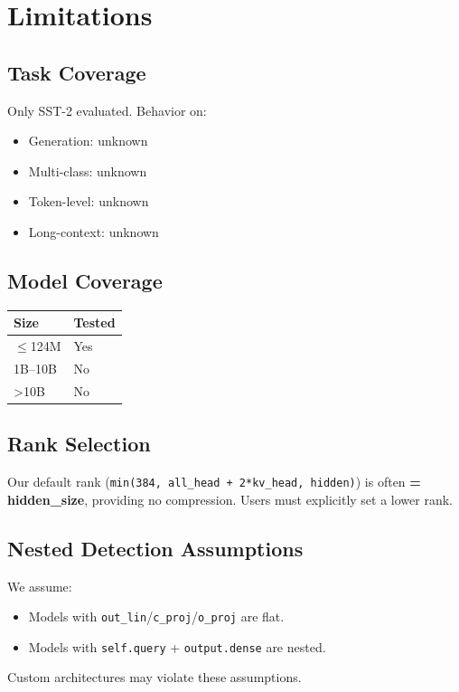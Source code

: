 \section{Limitations}

\subsection{Task Coverage}

Only SST-2 evaluated. Behavior on:
\begin{itemize}
\item Generation: unknown
\item Multi-class: unknown
\item Token-level: unknown
\item Long-context: unknown

\end{itemize}
\subsection{Model Coverage}

\begin{table}[H]
\centering
\small
\begin{tabular}{ll}
\toprule
\textbf{Size} & \textbf{Tested} \\
\midrule
$\le$124M & Yes \\
1B--10B & No \\
\textgreater{}10B & No \\
\bottomrule
\end{tabular}
\end{table}

\subsection{Rank Selection}

Our default rank (\texttt{min(384, all\_head + 2*kv\_head, hidden)}) is often 
\textbf{= hidden\_size}, providing no compression. Users must explicitly set a 
lower rank.

\subsection{Nested Detection Assumptions}

We assume:
\begin{itemize}
\item Models with \texttt{out\_lin}/\texttt{c\_proj}/\texttt{o\_proj} are flat.
\item Models with \texttt{self.query} + \texttt{output.dense} are nested.

\end{itemize}
Custom architectures may violate these assumptions.


